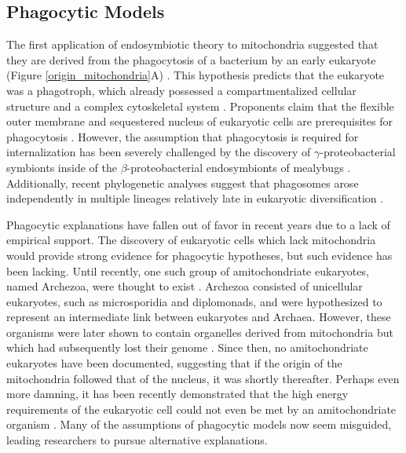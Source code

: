 \documentclass[12pt,twoside]{reedthesis}
\begin{document}
\subsection{Phagocytic Models}
The first application of endosymbiotic theory to mitochondria suggested that they are derived from the phagocytosis of a bacterium by an early eukaryote (Figure \ref{origin_mitochondria}A) \citep{margulis_origin_1970}.
This hypothesis predicts that the eukaryote was a phagotroph, which already possessed a compartmentalized cellular structure and a complex cytoskeletal system \citep{cavalier-smith_phagotrophic_2002, archibald_endosymbiosis_2015}.
Proponents claim that the flexible outer membrane and sequestered nucleus of eukaryotic cells are prerequisites for phagocytosis \citep{cavalier-smith_phagotrophic_2002}. 
However, the assumption that phagocytosis is required for internalization has been severely challenged by the discovery of $\gamma$-proteobacterial symbionts inside of the $\beta$-proteobacterial endosymbionts of mealybugs \citep{von_dohlen_mealybug_2001}.
Additionally, recent phylogenetic analyses suggest that phagosomes arose independently in multiple lineages relatively late in eukaryotic diversification \citep{yutin_origins_2009}.

Phagocytic explanations have fallen out of favor in recent years due to a lack of empirical support.
The discovery of eukaryotic cells which lack mitochondria would provide strong evidence for phagocytic hypotheses, but such evidence has been lacking.
Until recently, one such group of amitochondriate eukaryotes, named Archezoa, were thought to exist \citep{cavalier-smith_eukaryotes_1987}.
Archezoa consisted of unicellular eukaryotes, such as microsporidia and diplomonads, and were hypothesized to represent an intermediate link between eukaryotes and Archaea.
However, these organisms were later shown to contain organelles derived from mitochondria but which had subsequently lost their genome \citep{embley_mitochondria_2003, tovar_mitosomes_2007}.
Since then, no amitochondriate eukaryotes have been documented, suggesting that if the origin of the mitochondria followed that of the nucleus, it was shortly thereafter.
Perhaps even more damning, it has been recently demonstrated that the high energy requirements of the eukaryotic cell could not even be met by an amitochondriate organism \citep{lane_energetics_2010}.
Many of the assumptions of phagocytic models now seem misguided, leading researchers to pursue alternative explanations.
\end{document}
